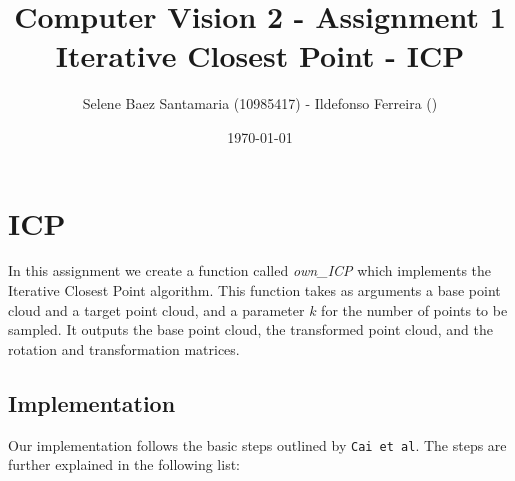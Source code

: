 \documentclass[11pt]{article}
\title{
	{Computer Vision 2 - Assignment 1\\
	 Iterative Closest Point - ICP}
}
\author{
Selene Baez Santamaria (10985417) - Ildefonso Ferreira ()}
\date{\today}
\begin{document}
\maketitle

\section{ICP}
In this assignment we create a function called \textit{own\_ICP} which implements the Iterative Closest Point algorithm. This function takes as arguments a base point cloud and a target point cloud, and a parameter $k$ for the number of points to be sampled. It outputs the base point cloud, the transformed point cloud, and the rotation and transformation matrices.

\subsection{Implementation}
Our implementation follows the basic steps outlined by \texttt{Cai et al}. The steps are further explained in the following list:
\end{document}
